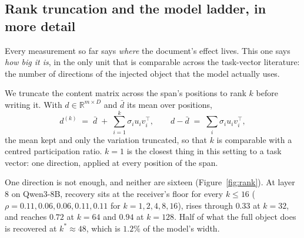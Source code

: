 \documentclass{article}
\newcommand{\dvec}{\ensuremath{d}}
\begin{document}
\begin{table}[h]
\caption{The channel and the truncation curve at three model widths, each with
its own restricted split and its own injection layer at matched relative depth.
$\rho$ is Eq.~\ref{eq:rho}; \emph{gold} is what the document itself is worth on
that model's restricted items, which is why the $0.6$B and $1.7$B rows have low
absolute accuracy and a large $n$: those models solve almost nothing without the
document, so almost every item qualifies. The knee of the truncation curve sits
between $k=32$ and $k=64$ at $d=1024$ and at $d=4096$ alike; a width-proportional
account predicts $k\approx12$ for the first.}
\label{tab:laddermodels}
\centering
\footnotesize
\setlength{\tabcolsep}{3pt}

\end{table}

\subsection{Rank truncation and the model ladder, in more detail}
\label{app:rank2}

Every measurement so far says \emph{where} the document's effect lives. This one
says \emph{how big it is}, in the only unit that is comparable across the
task-vector literature: the number of directions of the injected object that the
model actually uses.

We truncate the content matrix across the span's positions to rank $k$ before
writing it. With $\dvec \in \mathbb{R}^{m \times D}$ and $\bar{\dvec}$ its mean
over positions,
\begin{equation}
\dvec^{(k)} \;=\; \bar{\dvec} \;+\; \sum_{i=1}^{k} \sigma_i u_i v_i^{\top},
\qquad
\dvec - \bar{\dvec} \;=\; \textstyle\sum_i \sigma_i u_i v_i^{\top},
\end{equation}
the mean kept and only the variation truncated, so that $k$ is comparable with a
centred participation ratio. $k=1$ is the closest thing in this setting to a
task vector: one direction, applied at every position of the span.

One direction is not enough, and neither are sixteen
(Figure~\ref{fig:rank}). At layer $8$ on Qwen3-8B, recovery sits at the
receiver's floor for every $k \le 16$ ($\rho = 0.11, 0.06, 0.06, 0.11, 0.11$ for
$k = 1,2,4,8,16$), rises through $0.33$ at $k=32$, and reaches $0.72$ at $k=64$
and $0.94$ at $k=128$. Half of what the full object does is recovered at
$k^{*}\approx 48$, which is $1.2\%$ of the model's width.
\end{document}
